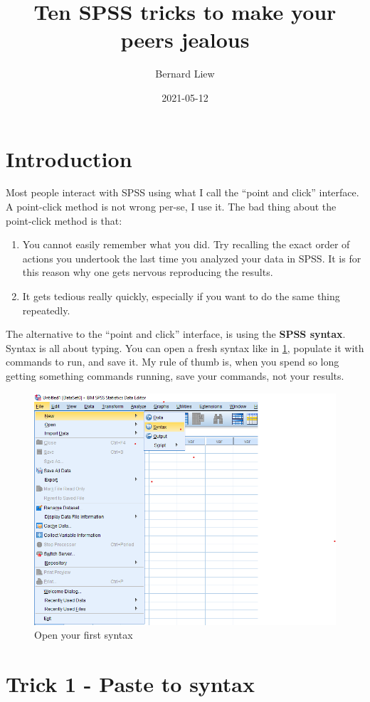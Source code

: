 \documentclass[
]{book}
\title{Ten SPSS tricks to make your peers jealous}
\author{Bernard Liew}
\date{2021-05-12}
\begin{document}
\maketitle

{
\setcounter{tocdepth}{1}
\tableofcontents
}
\hypertarget{introduction}{%
\chapter*{Introduction}\label{introduction}}

Most people interact with SPSS using what I call the ``point and click'' interface. A point-click method is not wrong per-se, I use it. The bad thing about the point-click method is that:

\begin{enumerate}
\def\labelenumi{\arabic{enumi})}
\item
  You cannot easily remember what you did. Try recalling the exact order of actions you undertook the last time you analyzed your data in SPSS. It is for this reason why one gets nervous reproducing the results.
\item
  It gets tedious really quickly, especially if you want to do the same thing repeatedly.
\end{enumerate}

The alternative to the ``point and click'' interface, is using the \textbf{SPSS syntax}. Syntax is all about typing. You can open a fresh syntax like in \ref{fig:first-syntax}, populate it with commands to run, and save it. My rule of thumb is, when you spend so long getting something commands running, save your commands, not your results.

\begin{figure}
\includegraphics[width=0.5\linewidth]{images/open_syntax} \caption{Open your first syntax}\label{fig:first-syntax}
\end{figure}

\hypertarget{trick-1---paste-to-syntax}{%
\chapter*{Trick 1 - Paste to syntax}\label{trick-1---paste-to-syntax}}
\end{document}
